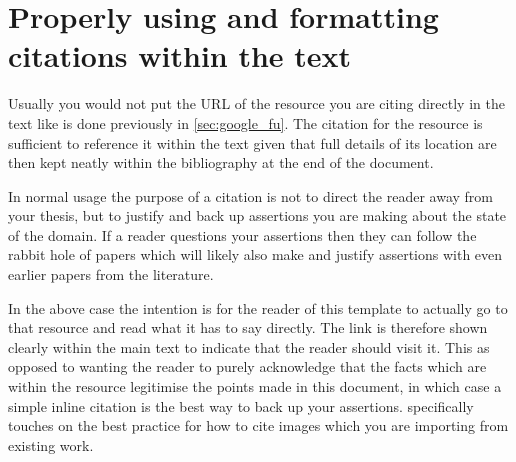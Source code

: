 	\section{Properly using and formatting citations within the text}

Usually you would not put the URL of the resource you are citing directly in the text like is done previously in \cref{sec:google_fu}.
The citation for the resource \cite{gwern} is sufficient to reference it within the text given that full details of its location are then kept neatly within the bibliography at the end of the document.

In normal usage the purpose of a citation is not to direct the reader away from your thesis, but to justify and back up assertions you are making about the state of the domain.
If a reader questions your assertions then they can follow the rabbit hole of papers which will likely also make and justify assertions with even earlier papers from the literature. 

In the above case the intention is for the reader of this template to actually go to that resource and read what it has to say directly.
The link is therefore shown clearly within the main text to indicate that the reader should visit it.
This as opposed to wanting the reader to purely acknowledge that the facts which are within the resource legitimise the points made in this document, in which case a simple inline citation is the best way to back up your assertions.
 specifically touches on the best practice for how to cite images which you are importing from existing work. 
